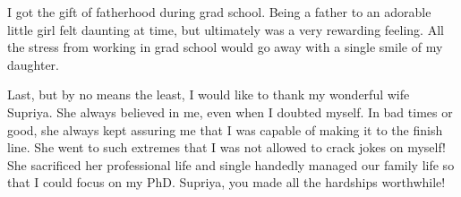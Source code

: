 I got the gift of fatherhood during grad school.
Being a father to an adorable little girl felt daunting at time, but ultimately was a very rewarding feeling.
All the stress from working in grad school would go away with a single smile of my daughter.

Last, but by no means the least, I would like to thank my wonderful wife Supriya. 
She always believed in me, even when I doubted myself. 
In bad times or good, she always kept assuring me that I was capable of making it to the finish line. 
She went to such extremes that I was not allowed to crack jokes on myself! 
She sacrificed her professional life and single handedly managed our family life so that I could focus on my PhD. 
Supriya, you made all the hardships worthwhile! 